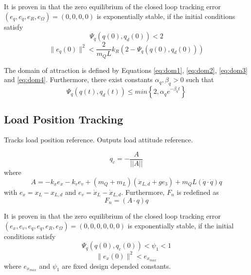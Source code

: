 It is proven in \cite{Sreenath2013c} that the zero equilibrium of the closed loop tracking error $ (e_q,e_{\dot{q}},e_R,e_\Omega)=(0,0,0,0) $ is exponentially stable, if the initial conditions satisfy
\begin{equation}\label{eq:dom3}
\Psi_q(q(0),q_d(0))<2
\end{equation}
\begin{equation}\label{eq:dom4}
\parallel e_{\dot{q}}(0)\parallel^2<\frac{2}{m_QL}{k_R}(2-\Psi_q(q(0),q_d(0)))
\end{equation}

The domain of attraction is defined by Equations \ref{eq:dom1}, \ref{eq:dom2}, \ref{eq:dom3} and \ref{eq:dom4}.
Furthermore, there exist constants $ \alpha_q,\beta_q>0 $ such that
\begin{equation}\label{eq:con.Psiqconv}
\Psi_q(q(t),q_d(t)) \leq min\left\lbrace 2,\alpha_qe^{-\beta_qt}\right\rbrace 
\end{equation}

\subsection{Load Position Tracking}\label{sec:con.loadpos}


Tracks load position reference. Outputs load attitude reference.

\begin{equation}\label{eq:con.q}
q_c = - \frac{A}{||A||}
\end{equation}
where
\begin{equation}\label{key}
A = -k_xe_x-k_ve_v+(m_Q+m_L)(\ddot{x}_{L,d}+ge_3)+m_QL(\dot{q}\cdot\dot{q})q
\end{equation}
with $ e_x=x_L-x_{L,d} $ and $ e_v=\dot{x}_L-\dot{x}_{L,d} $.
Furthermore, $ F_n $ is redefined as
\begin{equation}\label{key}
F_n=(A\cdot q)q
\end{equation}

It is proven in \cite{Sreenath2013c} that the zero equilibrium of the closed loop tracking error $ (e_x,e_v,e_q,e_{\dot{q}},e_R,e_\Omega)=(0,0,0,0,0,0) $ is exponentially stable, if the initial conditions satisfy
\begin{equation}\label{eq:dom5}
\Psi_q(q(0),q_c(0))<\psi_1<1
\end{equation}
\begin{equation}
\parallel e_{x}(0)\parallel^2<e_{x_{max}}
\end{equation}
where $ e_{x_{max}} $ and $ \psi_1 $ are fixed design depended constants. 

